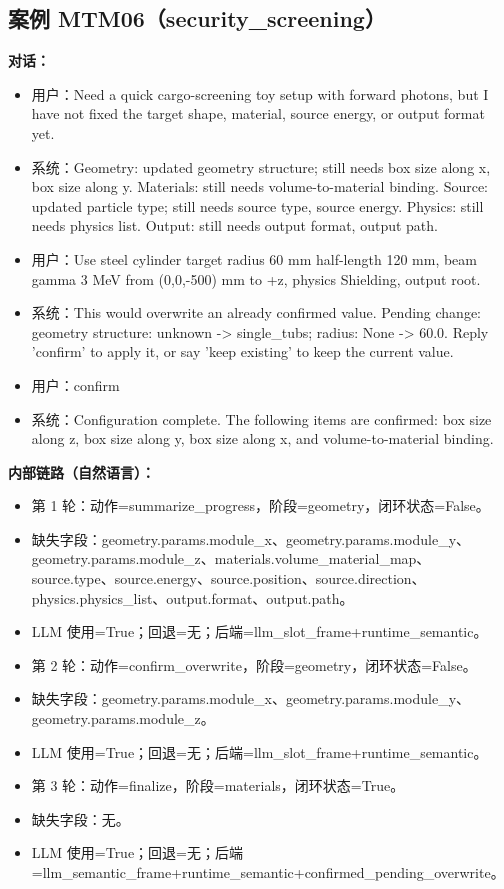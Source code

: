 \documentclass[11pt]{ctexart}
\begin{document}
\subsection{案例 MTM06（security\_screening）}
\textbf{对话：}
\begin{itemize}
\item 用户：Need a quick cargo-screening toy setup with forward photons, but I have not fixed the target shape, material, source energy, or output format yet.
\item 系统：Geometry: updated geometry structure; still needs box size along x, box size along y. Materials: still needs volume-to-material binding. Source: updated particle type; still needs source type, source energy. Physics: still needs physics list. Output: still needs output format, output path.
\item 用户：Use steel cylinder target radius 60 mm half-length 120 mm, beam gamma 3 MeV from (0,0,-500) mm to +z, physics Shielding, output root.
\item 系统：This would overwrite an already confirmed value. Pending change: geometry structure: unknown -> single\_tubs; radius: None -> 60.0. Reply 'confirm' to apply it, or say 'keep existing' to keep the current value.
\item 用户：confirm
\item 系统：Configuration complete. The following items are confirmed: box size along z, box size along y, box size along x, and volume-to-material binding.
\end{itemize}
\textbf{内部链路（自然语言）：}
\begin{itemize}
\item 第 1 轮：动作=summarize\_progress，阶段=geometry，闭环状态=False。
\item 缺失字段：geometry.params.module\_x、geometry.params.module\_y、geometry.params.module\_z、materials.volume\_material\_map、source.type、source.energy、source.position、source.direction、physics.physics\_list、output.format、output.path。
\item LLM 使用=True；回退=无；后端=llm\_slot\_frame+runtime\_semantic。
\item 第 2 轮：动作=confirm\_overwrite，阶段=geometry，闭环状态=False。
\item 缺失字段：geometry.params.module\_x、geometry.params.module\_y、geometry.params.module\_z。
\item LLM 使用=True；回退=无；后端=llm\_slot\_frame+runtime\_semantic。
\item 第 3 轮：动作=finalize，阶段=materials，闭环状态=True。
\item 缺失字段：无。
\item LLM 使用=True；回退=无；后端=llm\_semantic\_frame+runtime\_semantic+confirmed\_pending\_overwrite。
\end{itemize}
\end{document}
